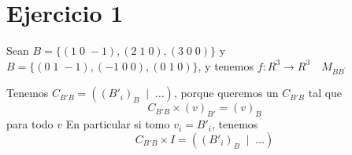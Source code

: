 \documentclass{article}
\begin{document}
\section{Ejercicio 1}
Sean $B = \{(1 \; 0\; -1), (2 \; 1 \; 0), (3 \; 0 \; 0)\}$ y
$B = \{(0 \; 1\; -1), (-1 \; 0 \; 0), (0 \; 1 \; 0)\}$, y tenemos \(
f : R^3 \to R^3 \quad M_{BB^{'} }
\)

Tenemos $C_{B'B} = ((B'_i)_B \; \mid \; \dots)$, porque queremos un
$C_{B'B}$ tal que \[C_{B'B} \times (v)_{B'} = (v)_B\] para todo $v$
En particular si tomo $v_i = B'_i$, tenemos \[
	C_{B'B} \times I = ((B'_i)_B \; \mid \; \dots)
\]
\end{document}
